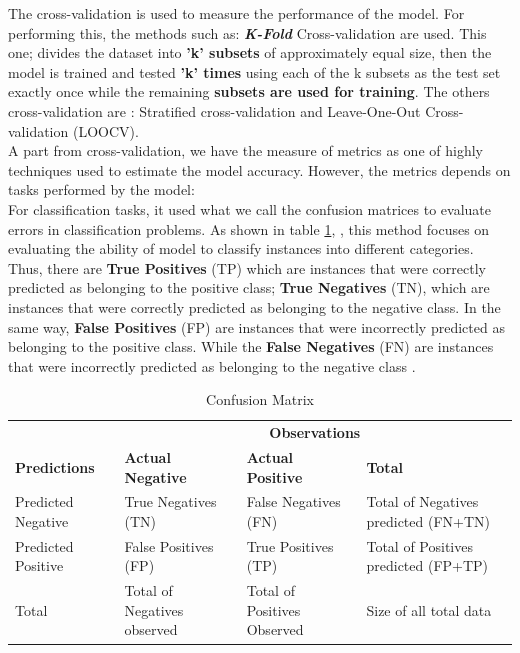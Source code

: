 \documentclass[12pt,a4paper, oneside]{book}
\begin{document}
The cross-validation is used to measure the performance of the model. For performing this, the methods such as: \textbf{\textit{K-Fold}} Cross-validation are used. This one; divides the dataset into \textbf{'k' subsets }of approximately equal size, then the model is trained and tested \textbf{'k' times} using each of the k subsets as the test set exactly once while the remaining \textbf{subsets are used for training}. The others cross-validation are : Stratified cross-validation and Leave-One-Out Cross-validation (LOOCV). \\

A part from cross-validation, we have the measure of metrics as one of highly techniques used to estimate the model accuracy. However, the metrics depends on tasks performed by the model: \\

For classification tasks, it used what we call the confusion matrices to evaluate errors in classification problems.
As shown in table \ref{tab:confusionMatrixTable}, \citep{raschka2018model} , this method focuses on evaluating the ability of model to classify instances into different categories. Thus, there are \textbf{True Positives} (TP) which are instances that were correctly predicted as belonging to the positive class; \textbf{True Negatives} (TN), which are instances that were correctly predicted as belonging to the negative class. In the same way, \textbf{False Positives} (FP) are instances that were incorrectly predicted as belonging to the positive class. While the \textbf{False Negatives} (FN) are instances that were incorrectly predicted as belonging to the negative class \citep{maria2016performance}. 
\begin{table}[h]
	\centering
	\begin{tabular}{|p{3cm}|p{3.5cm}|p{3cm}|p{5cm}|} 
		\cline{2-4}
		\multicolumn{1}{c|}{}& \multicolumn{3}{c|}{\textbf{Observations}}   \\
		\cline{1-4} 
		\textbf{Predictions}	& \textbf{Actual Negative} & \textbf{Actual Positive} & \textbf{Total}\\
		\hline
		Predicted Negative & True Negatives (TN) & False Negatives (FN) & Total of Negatives predicted  (FN+TN)\\
		\hline
		Predicted Positive & False Positives (FP) & True Positives (TP) & Total of Positives predicted  (FP+TP)\\
		\hline
		Total & Total of Negatives observed & Total of Positives Observed & Size of all total data\\
		\hline
	\end{tabular} 
	\caption{Confusion Matrix}
	\label{tab:confusionMatrixTable}
\end{table}
\end{document}
